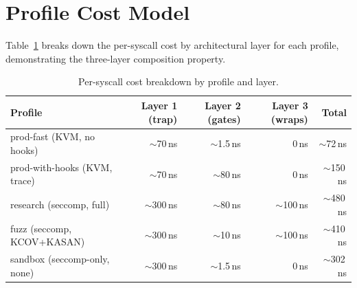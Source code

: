 \section{Profile Cost Model}
\label{sec:bench-profiles}

Table~\ref{tab:profile-cost} breaks down the per-syscall cost by
architectural layer for each profile, demonstrating the three-layer
composition property.

\begin{table}[htbp]
\centering
\caption{Per-syscall cost breakdown by profile and layer.}
\label{tab:profile-cost}
\begin{tabular}{@{}lrrrr@{}}
\toprule
Profile & Layer 1 (trap) & Layer 2 (gates) & Layer 3 (wraps) & Total \\
\midrule
prod-fast (KVM, no hooks)     & $\sim$70\,ns  & $\sim$1.5\,ns  & 0\,ns         & $\sim$72\,ns \\
prod-with-hooks (KVM, trace)  & $\sim$70\,ns  & $\sim$80\,ns   & 0\,ns         & $\sim$150\,ns \\
research (seccomp, full)      & $\sim$300\,ns & $\sim$80\,ns   & $\sim$100\,ns & $\sim$480\,ns \\
fuzz (seccomp, KCOV+KASAN)    & $\sim$300\,ns & $\sim$10\,ns   & $\sim$100\,ns & $\sim$410\,ns \\
sandbox (seccomp-only, none)  & $\sim$300\,ns & $\sim$1.5\,ns  & 0\,ns         & $\sim$302\,ns \\
\bottomrule
\end{tabular}
\end{table}

